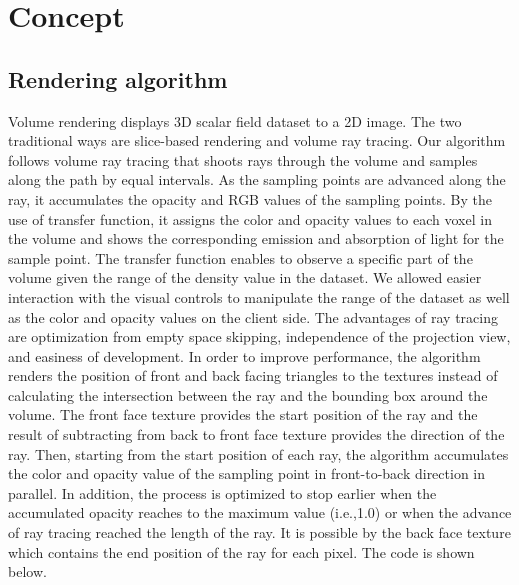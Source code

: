 \documentclass[annual]{acmsiggraph}
\begin{document}
\section{Concept}
\subsection{Rendering algorithm}

Volume rendering displays 3D scalar field dataset to a 2D image. The two traditional ways are slice-based rendering and volume ray tracing. Our algorithm follows volume ray tracing that shoots rays through the volume and samples along the path by equal intervals. As the sampling points are advanced along the ray, it accumulates the opacity and RGB values of the sampling points. By the use of transfer function, it assigns the color and opacity values to each voxel in the volume and shows the corresponding emission and absorption of light for the sample point. The transfer function enables to observe a specific part of the volume given the range of the density value in the dataset. We allowed easier interaction with the visual controls to manipulate the range of the dataset as well as the color and opacity values on the client side. 
The advantages of ray tracing are optimization from empty space skipping, independence of the projection view, and easiness of development. In order to improve performance, the algorithm renders the position of front and back facing triangles to the textures instead of calculating the intersection between the ray and the bounding box around the volume. The front face texture provides the start position of the ray and the result of subtracting from back to front face texture provides the direction of the ray. Then, starting from the start position of each ray, the algorithm accumulates the color and opacity value of the sampling point in front-to-back direction in parallel. In addition, the process is optimized to stop earlier when the accumulated opacity reaches to the maximum value (i.e.,1.0) or when the advance of ray tracing reached the length of the ray. It is possible by the back face texture which contains the end position of the ray for each pixel. The code is shown below.
\end{document}
